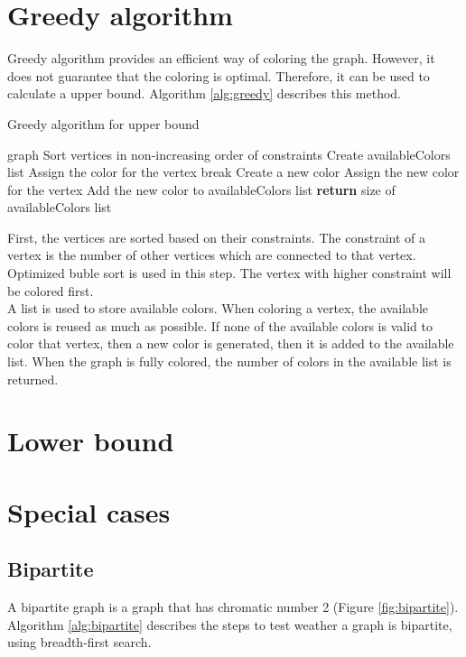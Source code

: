 \documentclass[a4paper]{report}
\begin{document}
		\section{Greedy algorithm}
		Greedy algorithm \cite{greedy} provides an efficient way of coloring the graph. However,  it does not guarantee that the coloring is optimal. Therefore, it can be used to calculate a upper bound. Algorithm \ref{alg:greedy} describes this method.\\
		\begin{algorithm}
			\caption{Greedy algorithm for upper bound}
			\label{alg:greedy}
			\begin{algorithmic}[1]
				\REQUIRE graph
				\STATE Sort vertices in non-increasing order of constraints
				\STATE Create availableColors list
					\STATE Assign the color for the vertex
					\STATE break
					\ENDIF
					\ENDFOR
					\STATE Create a new color
					\STATE Assign the new color for the vertex
					\STATE Add the new color to availableColors list
					\ENDIF
				\ENDFOR
				\STATE \textbf{return} size of availableColors list
			\end{algorithmic}
		\end{algorithm}
		First, the vertices are sorted based on their constraints. The constraint of a vertex is  the number of other vertices which are connected to that vertex. Optimized buble sort \cite{bubblesort2019} is used in this step. The vertex with higher constraint will be colored first.\\
		A list is used to store available colors. When coloring a vertex, the available colors is reused as much as possible. If none of the available colors is valid to color that vertex, then a new color is generated, then it is added to the available list. When the graph is fully colored, the number of colors in the available list is returned.\\
		
		\section{Lower bound}
		
		\section{Special cases}
			\subsection{Bipartite}
			A bipartite graph is a graph that has chromatic number 2 (Figure \ref{fig:bipartite}). Algorithm \ref{alg:bipartite} \cite{bipartite} describes the steps to test weather a graph is bipartite, using breadth-first search. \\
			
\end{document}
